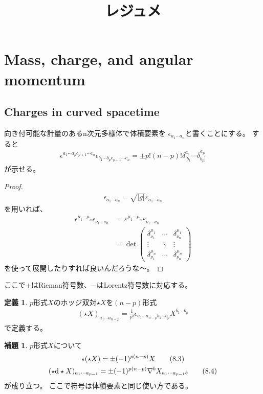 \documentclass[a4paper, 12pt]{jsarticle}
\title{レジュメ}
\theoremstyle{definition}
\newcommand{\ddif}{{\rm d}}
\newtheorem*{definition}{定義}
\newtheorem*{lemma}{補題}
\begin{document}
\maketitle

\setcounter{section}{7}

\section{Mass, charge, and angular momentum}
\subsection{Charges in curved spacetime}
向き付可能な計量のあるn次元多様体で体積要素を
$\epsilon_{a_1 \cdots a_n}$と書くことにする。
すると
\begin{align}
	\epsilon^{a_1 \cdots a_p c_{p+1} \cdots c_n}
	\epsilon_{b_1 \cdots b_p c_{p+1} \cdots c_n}
	= \pm p! (n-p)! \delta^{a_1}_{[b_1} \cdots \delta^{a_p}_{b_p]}
	\tag{8.1} \label{8.1}
\end{align}
が示せる。
\begin{proof}
	\begin{align}
		\epsilon_{a_1 \cdots a_n} = \sqrt{|g|} \varepsilon_{a_1 \cdots a_n}
	\end{align}
	を用いれば、
	\begin{align}
		\epsilon^{\mu_1 \cdots \mu_n} \epsilon_{\nu_1 \cdots \nu_n}
		&= \varepsilon^{\mu_1 \cdots \mu_n} \varepsilon_{\nu_1 \cdots \nu_n} \\
		&= \det \left( \begin{array}{ccc}
			\delta^{\mu_1}_{\nu_1} & \cdots & \delta^{\mu_1}_{\nu_n} \\
			\vdots & \ddots & \vdots \\
			\delta^{\mu_n}_{\nu_1} & \cdots & \delta^{\mu_n}_{\nu_n}
		\end{array} \right)
	\end{align}
	を使って展開したりすれば良いんだろうな～。
\end{proof}
ここで$+$はRieman符号数、$-$はLorentz符号数に対応する。
\begin{definition}
	$p$形式$X$のホッジ双対$\star X$を$(n - p)$形式
	\begin{align}
		(\star X)_{a_1 \cdots a_{n-p}} = \frac{1}{p!}
		\epsilon_{a_1 \cdots a_{n - p} b_1 \cdots b_p} X^{b_1 \cdots b_p}
		\tag{8.2} \label{8.2}
	\end{align}
	で定義する。
\end{definition}
\begin{lemma}
	$p$形式$X$について
	\begin{gather}
		\star (\star X) = \pm (-1)^{p(n-p)} X \tag{8.3} \label{8.3} \\
		(\star \ddif \star X)_{a_1 \cdots a_{p-1}}
		= \pm (-1)^{p(n-p)} \nabla^b X_{a_1 \cdots a_{p-1} b}
		\tag{8.4} \label{8.4}
	\end{gather}
	が成り立つ。
	ここで符号は体積要素と同じ使い方である。
\end{lemma}
\end{document}
